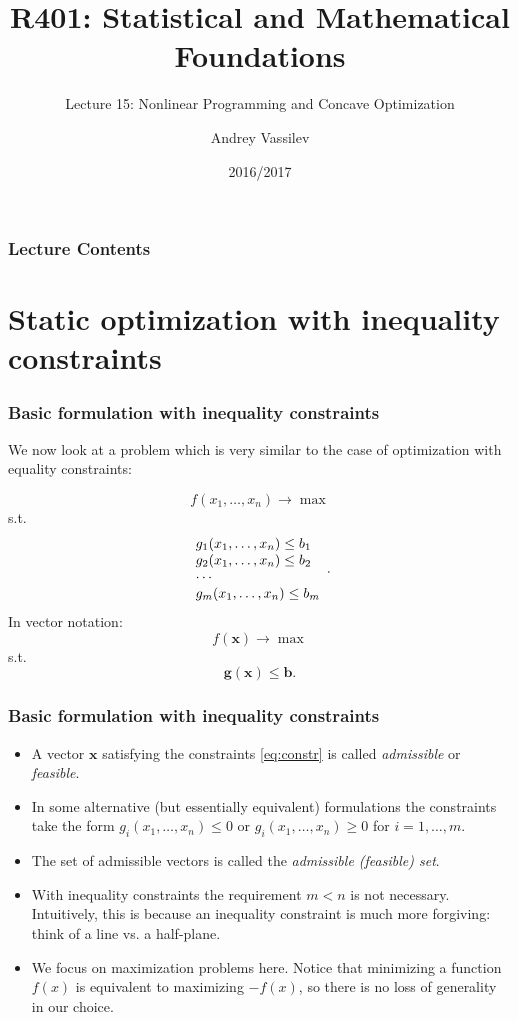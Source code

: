\documentclass[10pt]{beamer}
\title{R401: Statistical and Mathematical Foundations}
\subtitle{Lecture 15: Nonlinear Programming and Concave Optimization}
\author{Andrey Vassilev}
\date{2016/2017}
\theoremstyle{definition}
\begin{document}
\maketitle



\begin{frame}[fragile]
\frametitle{Lecture Contents}
\tableofcontents
\end{frame}

\section{Static optimization with inequality constraints}\label{sec:ineq}

\begin{frame}[fragile]
\frametitle{Basic formulation with inequality constraints}
We now look at a problem which is very similar to the case of optimization with equality constraints:

\begin{equation}
f(x_1,\ldots,x_n)\rightarrow \max 
\label{eq:obj}
\end{equation}
s.t.
\begin{equation}
\begin{array}{l l l}
g_1(x_1,\ldots,x_n) \leq b_1\\
g_2(x_1,\ldots,x_n) \leq b_2\\
\cdots \\
g_m(x_1,\ldots,x_n) \leq b_m\\
\end{array}.
\label{eq:constr}
\end{equation}
In vector notation:
\[ f(\mathbf{x}) \rightarrow \max \]
s.t. \[ \mathbf{g}(\mathbf{x})\leq \mathbf{b}. \]
\end{frame}

\begin{frame}[fragile]
\frametitle{Basic formulation with inequality constraints}
\begin{itemize}
\item A vector $ \mathbf{x} $ satisfying the constraints \eqref{eq:constr} is called \emph{admissible} or \emph{feasible}.\bigskip
\item In some alternative (but essentially equivalent) formulations the constraints take the form
$ g_i(x_1,\ldots,x_n)\leq 0 $ or $ g_i(x_1,\ldots,x_n)\geq 0 $ for $ i=1,\ldots,m $.\bigskip
\item The set of admissible vectors is called the \emph{admissible (feasible) set}.\bigskip
\item With inequality constraints the requirement $ m<n $ is not necessary. Intuitively, this is because an inequality constraint is much more forgiving: think of a line vs. a half-plane.\bigskip
\item We focus on maximization problems here. Notice that minimizing a function $ f(x) $ is equivalent to maximizing $ -f(x) $, so there is no loss of generality in our choice.
\end{itemize}
\end{frame}
\end{document}
